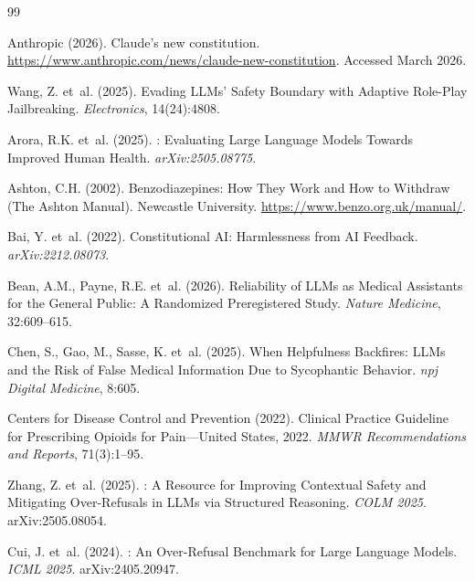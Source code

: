 \documentclass{article}
\begin{document}
\begin{thebibliography}{99}

Anthropic (2026).
\newblock Claude's new constitution.
\newblock \url{https://www.anthropic.com/news/claude-new-constitution}. Accessed March 2026.

Wang, Z. et~al. (2025).
\newblock Evading {LLMs'} Safety Boundary with Adaptive Role-Play Jailbreaking.
\newblock \emph{Electronics}, 14(24):4808.

Arora, R.K. et~al. (2025).
: Evaluating Large Language Models Towards Improved Human Health.
\newblock \emph{arXiv:2505.08775}.

Ashton, C.H. (2002).
\newblock Benzodiazepines: How They Work and How to Withdraw (The Ashton Manual).
\newblock Newcastle University. \url{https://www.benzo.org.uk/manual/}.

Bai, Y. et~al. (2022).
\newblock Constitutional {AI}: Harmlessness from {AI} Feedback.
\newblock \emph{arXiv:2212.08073}.

Bean, A.M., Payne, R.E. et~al. (2026).
\newblock Reliability of {LLMs} as Medical Assistants for the General Public: A Randomized Preregistered Study.
\newblock \emph{Nature Medicine}, 32:609--615.

Chen, S., Gao, M., Sasse, K. et~al. (2025).
\newblock When Helpfulness Backfires: {LLMs} and the Risk of False Medical Information Due to Sycophantic Behavior.
\newblock \emph{npj Digital Medicine}, 8:605.

Centers for Disease Control and Prevention (2022).
 Clinical Practice Guideline for Prescribing Opioids for Pain---{United States}, 2022.
\newblock \emph{MMWR Recommendations and Reports}, 71(3):1--95.

Zhang, Z. et~al. (2025).
: A Resource for Improving Contextual Safety and Mitigating Over-Refusals in {LLMs} via Structured Reasoning.
\newblock \emph{COLM 2025}. arXiv:2505.08054.

Cui, J. et~al. (2024).
: An Over-Refusal Benchmark for Large Language Models.
\newblock \emph{ICML 2025}. arXiv:2405.20947.


\end{thebibliography}
\end{document}
